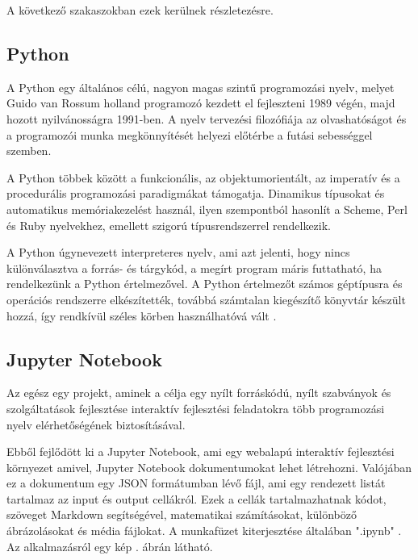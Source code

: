 A következő szakaszokban ezek kerülnek részletezésre.

\subsection{Python}
A Python egy általános célú, nagyon magas szintű programozási nyelv, melyet Guido van Rossum holland programozó kezdett el fejleszteni 1989 végén, majd hozott nyilvánosságra 1991-ben. A nyelv tervezési filozófiája az olvashatóságot és a programozói munka megkönnyítését helyezi előtérbe a futási sebességgel szemben.

A Python többek között a funkcionális, az objektumorientált, az imperatív és a procedurális programozási paradigmákat támogatja. Dinamikus típusokat és automatikus memóriakezelést használ, ilyen szempontból hasonlít a Scheme, Perl és Ruby nyelvekhez, emellett szigorú típusrendszerrel rendelkezik.

A Python úgynevezett interpreteres nyelv, ami azt jelenti, hogy nincs különválasztva a forrás- és tárgykód, a megírt program máris futtatható, ha rendelkezünk a Python értelmezővel. A Python értelmezőt számos géptípusra és operációs rendszerre elkészítették, továbbá számtalan kiegészítő könyvtár készült hozzá, így rendkívül széles körben használhatóvá vált \cite{python}.

\subsection{Jupyter Notebook}
Az egész egy projekt, aminek a célja egy nyílt forráskódú, nyílt szabványok és szolgáltatások fejlesztése interaktív fejlesztési feladatokra több programozási nyelv elérhetőségének biztosításával.

Ebből fejlődött ki a Jupyter Notebook, ami egy webalapú interaktív fejlesztési környezet amivel, Jupyter Notebook dokumentumokat lehet létrehozni. Valójában ez a dokumentum egy JSON formátumban lévő fájl, ami egy rendezett listát tartalmaz az input és output cellákról. Ezek a cellák tartalmazhatnak kódot, szöveget Markdown segítségével, matematikai számításokat, különböző ábrázolásokat és média fájlokat. A munkafüzet kiterjesztése általában ".ipynb" \cite{project_jupyter}. Az alkalmazásról egy kép . ábrán látható.

